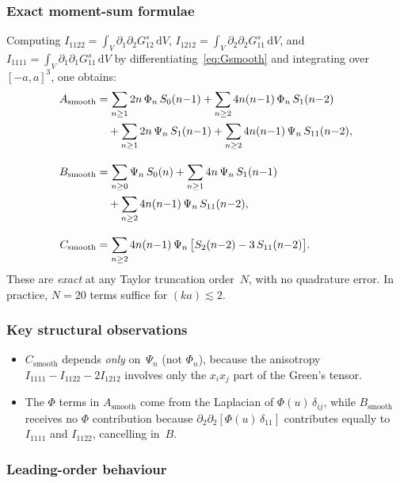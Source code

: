 \documentclass[11pt,a4paper]{article}
\newcommand{\dd}{\mathrm{d}}
\begin{document}
\subsubsection{Exact moment-sum formulae}

Computing
$I_{1122} = \int_V \partial_1\partial_2 G^s_{12}\,\dd V$,
$I_{1212} = \int_V \partial_2\partial_2 G^s_{11}\,\dd V$, and
$I_{1111} = \int_V \partial_1\partial_1 G^s_{11}\,\dd V$ by
differentiating~\eqref{eq:Gsmooth} and integrating over
$[-a,a]^3$, one obtains:
\begin{align}
  A_\text{smooth}
  &= \sum_{n \geq 1} 2n\,\Phi_n\,S_0(n{-}1)
   + \sum_{n \geq 2} 4n(n{-}1)\,\Phi_n\,S_1(n{-}2) \notag \\
  &\quad
   + \sum_{n \geq 1} 2n\,\Psi_n\,S_1(n{-}1)
   + \sum_{n \geq 2} 4n(n{-}1)\,\Psi_n\,S_{11}(n{-}2),
  \label{eq:Asmooth_exact} \\[8pt]
  B_\text{smooth}
  &= \sum_{n \geq 0} \Psi_n\,S_0(n)
   + \sum_{n \geq 1} 4n\,\Psi_n\,S_1(n{-}1) \notag \\
  &\quad
   + \sum_{n \geq 2} 4n(n{-}1)\,\Psi_n\,S_{11}(n{-}2),
  \label{eq:Bsmooth_exact} \\[8pt]
  C_\text{smooth}
  &= \sum_{n \geq 2} 4n(n{-}1)\,\Psi_n\,
     \bigl[S_2(n{-}2) - 3\,S_{11}(n{-}2)\bigr].
  \label{eq:Csmooth_exact}
\end{align}
These are \emph{exact} at any Taylor truncation order~$N$, with no
quadrature error. In practice, $N = 20$ terms suffice for
$(ka) \lesssim 2$.

\subsubsection{Key structural observations}

\begin{itemize}
  \item $C_\text{smooth}$ depends \emph{only} on~$\Psi_n$ (not
    $\Phi_n$), because the anisotropy
    $I_{1111} - I_{1122} - 2I_{1212}$ involves only the
    $x_i x_j$ part of the Green's tensor.
  \item The $\Phi$ terms in $A_\text{smooth}$ come from the Laplacian
    of $\Phi(u)\,\delta_{ij}$, while $B_\text{smooth}$ receives no
    $\Phi$ contribution because
    $\partial_2\partial_2[\Phi(u)\,\delta_{11}]$ contributes equally
    to $I_{1111}$ and $I_{1122}$, cancelling in~$B$.
\end{itemize}

\subsubsection{Leading-order behaviour}
\end{document}
